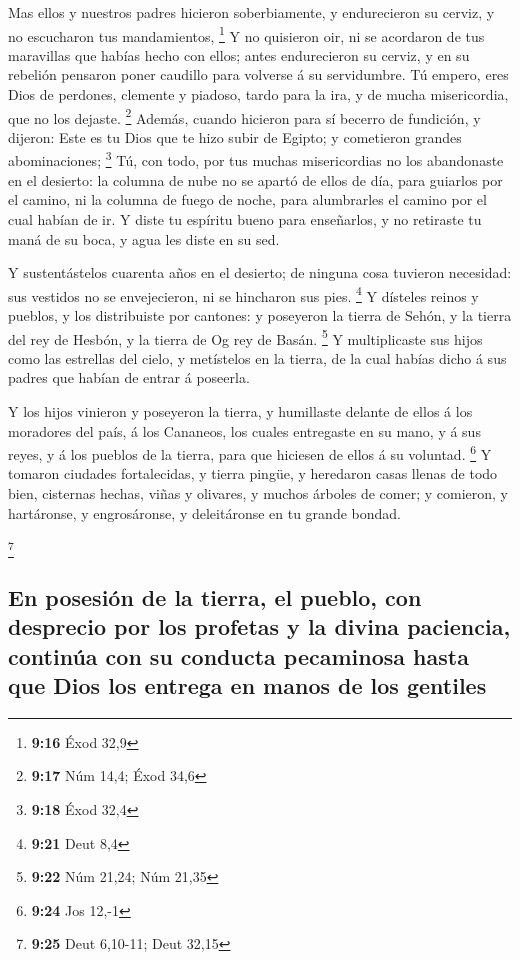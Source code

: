  Mas ellos y nuestros padres hicieron soberbiamente, y
endurecieron su cerviz, y no escucharon tus mandamientos, \footnote{\textbf{9:16}
  Éxod 32,9}  Y no quisieron oir, ni se acordaron de tus
maravillas que habías hecho con ellos; antes endurecieron su cerviz, y
en su rebelión pensaron poner caudillo para volverse á su servidumbre.
Tú empero, eres Dios de perdones, clemente y piadoso, tardo para la ira,
y de mucha misericordia, que no los dejaste. \footnote{\textbf{9:17} Núm
  14,4; Éxod 34,6}  Además, cuando hicieron para sí becerro
de fundición, y dijeron: Este es tu Dios que te hizo subir de Egipto; y
cometieron grandes abominaciones; \footnote{\textbf{9:18} Éxod 32,4}
 Tú, con todo, por tus muchas misericordias no los
abandonaste en el desierto: la columna de nube no se apartó de ellos de
día, para guiarlos por el camino, ni la columna de fuego de noche, para
alumbrarles el camino por el cual habían de ir.  Y diste tu
espíritu bueno para enseñarlos, y no retiraste tu maná de su boca, y
agua les diste en su sed.

 Y sustentástelos cuarenta años en el desierto; de ninguna
cosa tuvieron necesidad: sus vestidos no se envejecieron, ni se
hincharon sus pies. \footnote{\textbf{9:21} Deut 8,4}  Y
dísteles reinos y pueblos, y los distribuiste por cantones: y poseyeron
la tierra de Sehón, y la tierra del rey de Hesbón, y la tierra de Og rey
de Basán. \footnote{\textbf{9:22} Núm 21,24; Núm 21,35}  Y
multiplicaste sus hijos como las estrellas del cielo, y metístelos en la
tierra, de la cual habías dicho á sus padres que habían de entrar á
poseerla.

 Y los hijos vinieron y poseyeron la tierra, y humillaste
delante de ellos á los moradores del país, á los Cananeos, los cuales
entregaste en su mano, y á sus reyes, y á los pueblos de la tierra, para
que hiciesen de ellos á su voluntad. \footnote{\textbf{9:24} Jos 12,-1}
 Y tomaron ciudades fortalecidas, y tierra pingüe, y
heredaron casas llenas de todo bien, cisternas hechas, viñas y olivares,
y muchos árboles de comer; y comieron, y hartáronse, y engrosáronse, y
deleitáronse en tu grande bondad.

\footnote{\textbf{9:25} Deut 6,10-11; Deut 32,15}

\hypertarget{en-posesiuxf3n-de-la-tierra-el-pueblo-con-desprecio-por-los-profetas-y-la-divina-paciencia-continuxfaa-con-su-conducta-pecaminosa-hasta-que-dios-los-entrega-en-manos-de-los-gentiles}{%
\subsection{En posesión de la tierra, el pueblo, con desprecio por los
profetas y la divina paciencia, continúa con su conducta pecaminosa
hasta que Dios los entrega en manos de los
gentiles}\label{en-posesiuxf3n-de-la-tierra-el-pueblo-con-desprecio-por-los-profetas-y-la-divina-paciencia-continuxfaa-con-su-conducta-pecaminosa-hasta-que-dios-los-entrega-en-manos-de-los-gentiles}}

